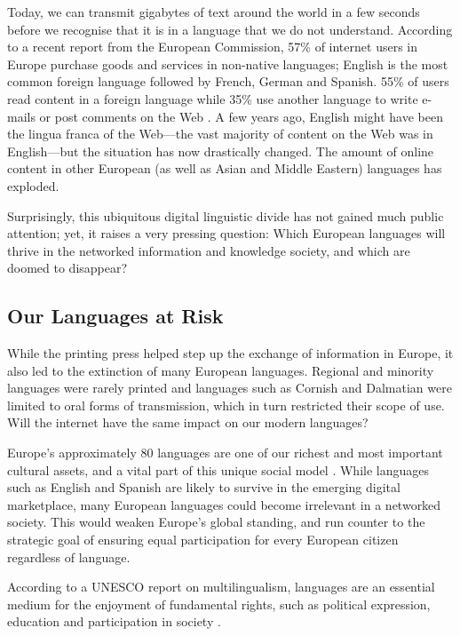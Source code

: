 \begin{multicols}{2}
Today, we can transmit gigabytes of text around the world in a few seconds before we recognise that it is in a language that we do not understand. According to a recent report from the European Commission, 57\% of internet users in Europe purchase goods and services in non-native languages; English is the most common foreign language followed by French, German and Spanish. 55\% of users read content in a foreign language while 35\% use another language to write e-mails or post comments on the Web \cite{EC1}. A few years ago, English might have been the lingua franca of the Web—the vast majority of content on the Web was in English—but the situation has now drastically changed. The amount of online content in other European (as well as Asian and Middle Eastern) languages has exploded.

Surprisingly, this ubiquitous digital linguistic divide has not gained much public attention; yet, it raises a very pressing question: Which European languages will thrive in the networked information and knowledge society, and which are doomed to disappear?

\subsection{Our Languages at Risk}

While the printing press helped step up the exchange of information in Europe, it also led to the extinction of many European languages. Regional and minority languages were rarely printed and languages such as Cornish and Dalmatian were limited to oral forms of transmission, which in turn restricted their scope of use. Will the internet have the same impact on our modern languages?

Europe’s approximately 80 languages are one of our richest and most important cultural assets, and a vital part of this unique social model \cite{EC2}. While languages such as English and Spanish are likely to survive in the emerging digital marketplace, many European languages could become irrelevant in a networked society. This would weaken Europe’s global standing, and run counter to the strategic goal of ensuring equal participation for every European citizen regardless of language.

According to a UNESCO report on multilingualism, languages are an essential medium for the enjoyment of fundamental rights, such as political expression, education and participation in society \cite{Unesco1}.



\end{multicols}
